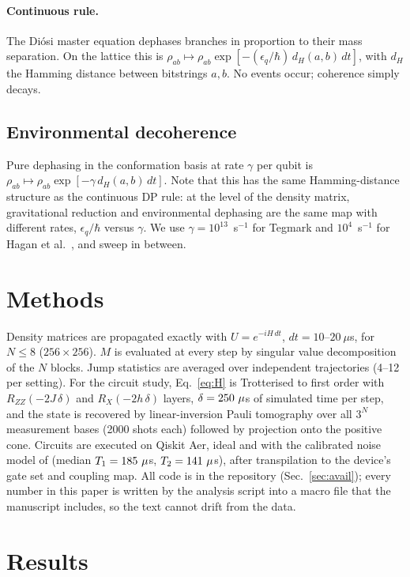 \documentclass[11pt]{article}
\begin{document}
\paragraph{Continuous rule.} The Di\'osi master equation dephases branches in proportion to their mass separation. On the lattice this is $\rho_{ab}\mapsto\rho_{ab}\exp[-(\epsilon_q/\hbar)\,d_H(a,b)\,dt]$, with $d_H$ the Hamming distance between bitstrings $a,b$. No events occur; coherence simply decays.

\subsection{Environmental decoherence}
Pure dephasing in the conformation basis at rate $\gamma$ per qubit is $\rho_{ab}\mapsto\rho_{ab}\exp[-\gamma\,d_H(a,b)\,dt]$. Note that this has the same Hamming-distance structure as the continuous DP rule: at the level of the density matrix, gravitational reduction and environmental dephasing are the same map with different rates, $\epsilon_q/\hbar$ versus $\gamma$. We use $\gamma=10^{13}$~s$^{-1}$ for Tegmark \citep{tegmark2000} and $10^{4}$~s$^{-1}$ for Hagan et al.\ \citep{hagan2002}, and sweep in between.

\section{Methods}
Density matrices are propagated exactly with $U=e^{-iH\,dt}$, $dt=10$--$20~\mu$s, for $N\le8$ ($256\times256$). $M$ is evaluated at every step by singular value decomposition of the $N$ blocks. Jump statistics are averaged over independent trajectories (4--12 per setting). For the circuit study, Eq.~\ref{eq:H} is Trotterised to first order with $R_{ZZ}(-2J\,\delta)$ and $R_X(-2h\,\delta)$ layers, $\delta=250~\mu$s of simulated time per step, and the state is recovered by linear-inversion Pauli tomography over all $3^N$ measurement bases (2000 shots each) followed by projection onto the positive cone. Circuits are executed on Qiskit Aer, ideal and with the calibrated noise model of \texttt{\Backend} (median $T_1=185~\mu$s, $T_2=141~\mu$s), after transpilation to the device's gate set and coupling map. All code is in the repository (Sec.~\ref{sec:avail}); every number in this paper is written by the analysis script into a macro file that the manuscript includes, so the text cannot drift from the data.

\section{Results}
\end{document}
